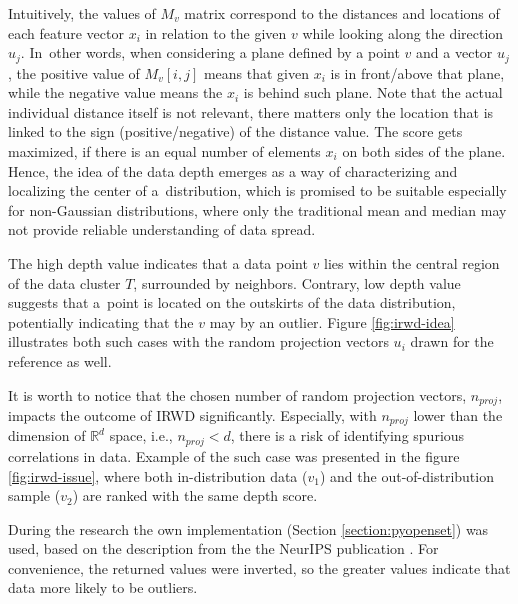 Intuitively, the values of $M_v$ matrix correspond to the distances and locations of each feature vector $x_i$ in relation to the given $v$ while looking along the direction $u_j$. In~other words, when considering a plane defined by a point $v$ and a vector $u_j$, the positive value of $M_v[i,j]$ means that given $x_i$ is in front/above that plane, while the negative value means the $x_i$ is behind such plane. Note that the actual individual distance itself is not relevant, there matters only the location that is linked to the sign (positive/negative) of the distance value. The score gets maximized, if there is an equal number of elements $x_i$ on both sides of the plane. Hence, the idea of the data depth emerges as a way of characterizing and localizing the center of a~distribution, which is promised to be suitable especially for non-Gaussian distributions, where only the traditional mean and median may not provide reliable understanding of data spread.

The high depth value indicates that a data point $v$ lies within the central region of the data cluster $T$, surrounded by neighbors. Contrary, low depth value suggests that a~point is located on the outskirts of the data distribution, potentially indicating that the $v$ may by an outlier. Figure \ref{fig:irwd-idea} illustrates both such cases with the random projection vectors $u_i$ drawn for the reference as well.

It is worth to notice that the chosen number of random projection vectors, $n_{proj}$, impacts the outcome of IRWD significantly. Especially, with $n_{proj}$ lower than the dimension of $\mathbb{R}^d$ space, i.e., $n_{proj} < d$, there is a risk of identifying spurious correlations in data. Example of the such case was presented in the figure \ref{fig:irwd-issue}, where both in-distribution data ($v_1$) and the out-of-distribution sample ($v_2$) are ranked with the same depth score.

During the research the own implementation (Section \ref{section:pyopenset}) was used, based on the description from the the NeurIPS publication \cite{Colombo-2022}. For convenience, the returned values were inverted, so the greater values indicate that data more likely to be outliers.
